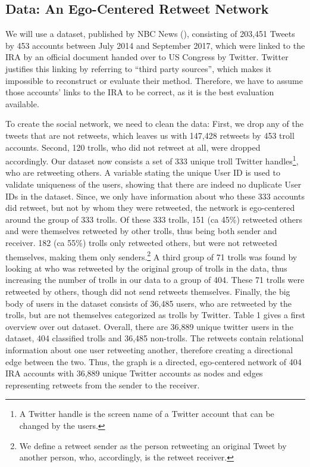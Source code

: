 \documentclass[12pt, titlepage=true, toc=bib]{scrartcl}
\begin{document}
\subsection{Data: An Ego-Centered Retweet Network}

We will use a dataset, published by NBC News (\cite*{popken_twitter_2018}), consisting of 203,451 Tweets by 453 accounts between July 2014 and September 2017, which were linked to the IRA by an official document handed over to US Congress by Twitter. Twitter justifies this linking by referring to ``third party sources'', which makes it impossible to reconstruct or evaluate their method. Therefore, we have to assume those accounts' links to the IRA to be correct, as it is the best evaluation available.

To create the social network, we need to clean the data: First, we drop any of the tweets that are not retweets, which leaves us with 147,428 retweets by 453 troll accounts. Second, 120 trolls, who did not retweet at all, were dropped accordingly. Our dataset now consists a set of 333 unique troll Twitter handles\footnote{A Twitter handle is the screen name of a Twitter account that can be changed by the users.}, who are retweeting others. A variable stating the unique User ID is used to validate uniqueness of the users, showing that there are indeed no duplicate User IDs in the dataset. Since, we only have information about who these 333 accounts did retweet, but not by whom they were retweeted, the network is ego-centered around the group of 333 trolls. Of these 333 trolls, 151 (ca 45\%) retweeted others and were themselves retweeted by other trolls, thus being both sender and receiver. 182 (ca 55\%) trolls only retweeted others, but were not retweeted themselves, making them only senders.\footnote{We define a retweet sender as the person retweeting an original Tweet by another person, who, accordingly, is the retweet receiver.} A third group of 71 trolls was found by looking at who was retweeted by the original group of trolls in the data, thus increasing the number of trolls in our data to a group of 404. These 71 trolls were retweeted by others, though did not send retweets themselves. Finally, the big body of users in the dataset consists of 36,485 users, who are retweeted by the trolls, but are not themselves categorized as trolls by Twitter. Table 1 gives a first overview over out dataset. Overall, there are 36,889 unique twitter users in the dataset, 404 classified trolls and 36,485 non-trolls. The retweets contain relational information about one user retweeting another, therefore creating a directional edge between the two. Thus, the graph is a directed, ego-centered network of 404 IRA accounts with 36,889 unique Twitter accounts as nodes and edges representing retweets from the sender to the receiver.
\end{document}
